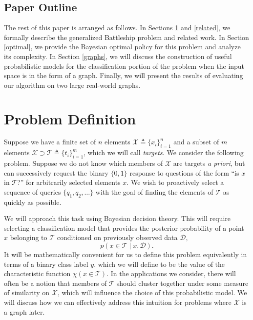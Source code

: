 \documentclass{acm_proc_article-sp}
\newcommand{\cm}[1]{\mathcal{#1}}
\newcommand{\data}{\cm{D}}
\newcommand{\given}{\mid}
\newcommand{\deq}{\triangleq}
\begin{document}
\subsection{Paper Outline}

The rest of this paper is arranged as follows.  In Sections
\ref{problem} and \ref{related}, we formally describe the generalized
Battleship problem and related work.  In Section \ref{optimal}, we
provide the Bayesian optimal policy for this problem and analyze its
complexity.  In Section \ref{graphs}, we will discuss the construction
of useful probabilistic models for the classification portion of the
problem when the input space is in the form of a graph.  Finally, we
will present the results of evaluating our algorithm on two large
real-world graphs.

\section{Problem Definition}
\label{problem}

Suppose we have a finite set of $n$ elements $\cm{X} \deq \lbrace x_i
\rbrace_{i = 1}^n$ and a subset of $m$ elements $\cm{X} \supset \cm{T}
\deq \lbrace t_i \rbrace_{i = 1}^m$, which we will call
\emph{targets.}  We consider the following problem.  Suppose we do not
know which members of $\cm{X}$ are targets \emph{a priori}, but can
successively request the binary $\lbrace 0, 1 \rbrace$ response to
questions of the form ``is $x$ in $\cm{T}$?'' for arbitrarily selected
elements $x$. We wish to proactively select a sequence of queries
$\lbrace q_1, q_2, \dotsc \rbrace$ with the goal of finding the
elements of $\cm{T}$ as quickly as possible.

We will approach this task using Bayesian decision theory.  This will
require selecting a classification model that provides the posterior
probability of a point $x$ belonging to $\cm{T}$ conditioned on
previously observed data $\data$,
\begin{equation*}
  p(x \in \cm{T} \given x, \data).
\end{equation*} 
It will be mathematically convenient for us to define this problem
equivalently in terms of a binary class label $y$, which we will
define to be the value of the characteristic function $\chi(x \in
\cm{T})$.  In the applications we consider, there will often be a
notion that members of $\cm{T}$ should cluster together under some
measure of similarity on $\cm{X}$, which will influence the choice of
this probabilistic model.  We will discuss how we can effectively
address this intuition for problems where $\cm{X}$ is a graph later.
\end{document}

